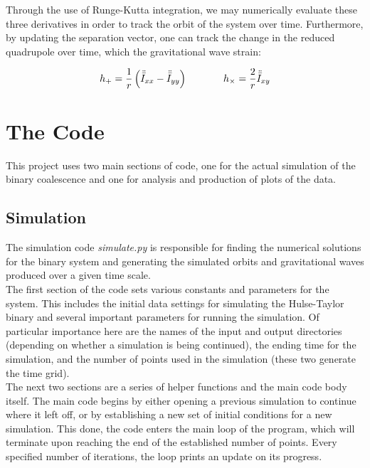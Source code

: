 \documentclass[11pt,letterpaper]{article}
\begin{document}
Through the use of Runge-Kutta integration, we may numerically evaluate these three derivatives in order to track the orbit of the system over time. Furthermore, by updating the separation vector, one can track the change in the reduced quadrupole over time, which the gravitational wave strain:

$$ h_+ = \frac{1}{r} \left( \ddot{\bar{I}}_{xx} - \ddot{\bar{I}}_{yy} \right) \hspace*{.5in} h_{\times} = \frac{2}{r} \ddot{\bar{I}}_{xy} $$

\section{The Code}

This project uses two main sections of code, one for the actual simulation of the binary coalescence and one for analysis and production of plots of the data.

\subsection{Simulation}

The simulation code \textit{simulate.py} is responsible for finding the numerical solutions for the binary system and generating the simulated orbits and gravitational waves produced over a given time scale. \\

The first section of the code sets various constants and parameters for the system. This includes the initial data settings for simulating the Hulse-Taylor binary and several important parameters for running the simulation. Of particular importance here are the names of the input and output directories (depending on whether a simulation is being continued), the ending time for the simulation, and the number of points used in the simulation (these two generate the time grid). \\

The next two sections are a series of helper functions and the main code body itself. The main code begins by either opening a previous simulation to continue where it left off, or by establishing a new set of initial conditions for a new simulation. This done, the code enters the main loop of the program, which will terminate upon reaching the end of the established number of points. Every specified number of iterations, the loop prints an update on its progress. \\
\end{document}
